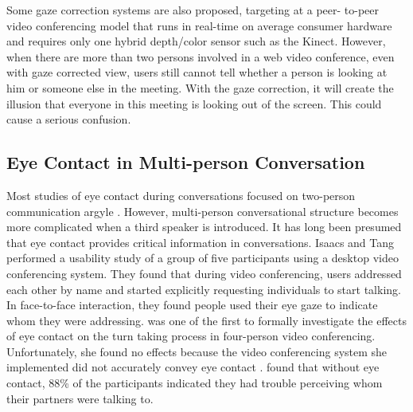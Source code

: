 Some gaze correction systems are also proposed, targeting at a peer- to-peer video conferencing model that runs in real-time on average consumer hardware and requires only one hybrid depth/color sensor such as the Kinect. \cite{10.1145/2366145.2366193} However, when there are more than two persons involved in a web video conference, even with gaze corrected view, users still cannot tell whether a person is looking at him or someone else in the meeting. With the gaze correction, it will create the illusion that everyone in this meeting is looking out of the screen. This could cause a serious confusion. 

\subsection{Eye Contact in Multi-person Conversation}

Most studies of eye contact during conversations focused on two-person communication argyle \cite{argyle_cook_cramer_1994}. 
However, multi-person conversational structure becomes more complicated when a third speaker is introduced. It has long been presumed that eye contact provides critical information in conversations. Isaacs and Tang \cite{10.1145/166266.166289} performed a usability study of a group of five participants using a desktop video conferencing system. They found that during video conferencing, users addressed each other by name and started explicitly requesting individuals to start talking. In face-to-face interaction, they found people used their eye gaze to indicate whom they were addressing. \cite{10.1207/s15327051hci1004_2} was one of the first to formally investigate the effects of eye contact on the turn taking process in four-person video conferencing. Unfortunately, she found no effects because the video conferencing system she implemented did not accurately convey eye contact \cite{10.1207/s15327051hci1004_2}. \cite{article2} found that without eye contact, 88\% of the participants indicated they had trouble perceiving whom their partners were talking to. 

